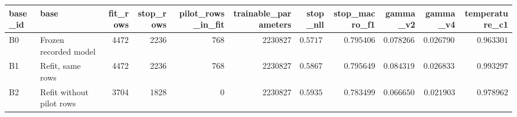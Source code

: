 \begin{tabular}{llrrrrrrrrr}
\toprule
base\_id & base & fit\_rows & stop\_rows & pilot\_rows\_in\_fit & trainable\_parameters & stop\_nll & stop\_macro\_f1 & gamma\_v2 & gamma\_v4 & temperature\_c1 \\
\midrule
B0 & Frozen recorded model & 4472 & 2236 & 768 & 2230827 & $0.571785$ & $0.795406$ & $0.0782668$ & $0.0267908$ & $0.963301$ \\
B1 & Refit, same rows & 4472 & 2236 & 768 & 2230827 & $0.586745$ & $0.795649$ & $0.0843198$ & $0.0268334$ & $0.993297$ \\
B2 & Refit without pilot rows & 3704 & 1828 & 0 & 2230827 & $0.59351$ & $0.783499$ & $0.0666504$ & $0.021903$ & $0.978962$ \\
\bottomrule
\end{tabular}
